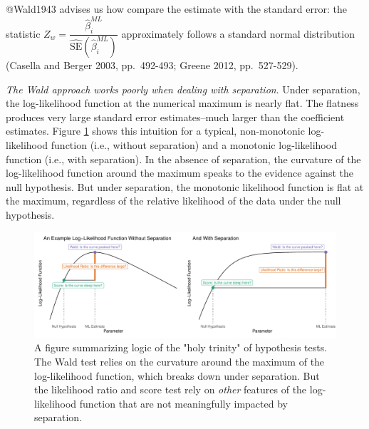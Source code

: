 \documentclass[
]{article}
\begin{document}
\noindent @Wald1943 advises us how compare the estimate with the
standard error: the statistic
\(Z_w = \dfrac{\hat{\beta}_i^{ML}}{\widehat{\text{SE}}(\hat{\beta}_i^{ML})}\)
approximately follows a standard normal distribution (Casella and Berger
2003, pp.~492-493; Greene 2012, pp.~527-529).

\emph{The Wald approach works poorly when dealing with separation}.
Under separation, the log-likelihood function at the numerical maximum
is nearly flat. The flatness produces very large standard error
estimates--much larger than the coefficient estimates. Figure
\ref{fig:trinity} shows this intuition for a typical, non-monotonic
log-likelihood function (i.e., without separation) and a monotonic
log-likelihood function (i.e., with separation). In the absence of
separation, the curvature of the log-likelihood function around the
maximum speaks to the evidence against the null hypothesis. But under
separation, the monotonic likelihood function is flat at the maximum,
regardless of the relative likelihood of the data under the null
hypothesis.

\begin{figure}[h]
\includegraphics[width=\textwidth]{doc/fig/intuition.pdf}
\caption{A figure summarizing logic of the "holy trinity" of hypothesis tests. The Wald test relies on the curvature around the maximum of the log-likelihood function, which breaks down under separation. But the likelihood ratio and score test rely on \textit{other} features of the log-likelihood function that are not meaningfully impacted by separation.}\label{fig:trinity}
\end{figure}
\end{document}
